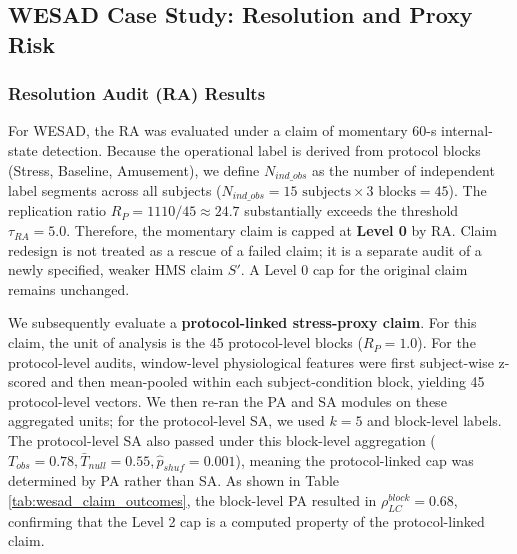 \documentclass[journal]{IEEEtran}
\begin{document}
\subsection{WESAD Case Study: Resolution and Proxy Risk}

\subsubsection{Resolution Audit (RA) Results}
For WESAD, the RA was evaluated under a claim of momentary 60-s internal-state detection. Because the operational label is derived from protocol blocks (Stress, Baseline, Amusement), we define $N_{ind\_obs}$ as the number of independent label segments across all subjects ($N_{ind\_obs} = 15 \text{ subjects} \times 3 \text{ blocks} = 45$). The replication ratio $R_P = 1110/45 \approx 24.7$ substantially exceeds the threshold $\tau_{RA} = 5.0$. Therefore, the momentary claim is capped at \textbf{Level 0} by RA. Claim redesign is not treated as a rescue of a failed claim; it is a separate audit of a newly specified, weaker HMS claim $S'$. A Level 0 cap for the original claim remains unchanged.

We subsequently evaluate a \textbf{protocol-linked stress-proxy claim}. For this claim, the unit of analysis is the 45 protocol-level blocks ($R_P = 1.0$). For the protocol-level audits, window-level physiological features were first subject-wise z-scored and then mean-pooled within each subject-condition block, yielding 45 protocol-level vectors. We then re-ran the PA and SA modules on these aggregated units; for the protocol-level SA, we used $k=5$ and block-level labels. The protocol-level SA also passed under this block-level aggregation ($T_{obs}=0.78, \bar{T}_{null}=0.55, \hat{p}_{shuf}=0.001$), meaning the protocol-linked cap was determined by PA rather than SA. As shown in Table \ref{tab:wesad_claim_outcomes}, the block-level PA resulted in $\rho^{block}_{LC} = 0.68$, confirming that the Level 2 cap is a computed property of the protocol-linked claim.
\end{document}
